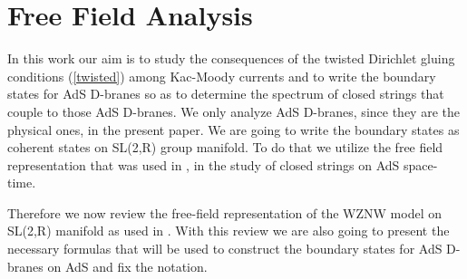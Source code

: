 \documentclass[a4paper,12pt]{article}
\begin{document}
\section{Free Field Analysis}

In this work our aim is to study the consequences of the twisted Dirichlet
gluing conditions (\ref{twisted}) among Kac-Moody currents and to write the
boundary states for AdS\coordHE{} D-branes so as to determine the spectrum of
closed strings that couple to those AdS\coordHE{} D-branes. We only analyze AdS\coordHE{} D-branes, since they are the physical ones, in the present paper. We
are going to write the boundary states as coherent states on SL(2,R) group
manifold. To do that we utilize the free field representation that was used
in \cite{bars1},\cite{BDM} in the study of closed strings on AdS\coordHE{}
space-time.

Therefore we now review the free-field representation of the WZNW model on
SL(2,R) manifold as used in \cite{BDM}. With this review we are also going
to present the necessary formulas that will be used to construct the
boundary states for AdS\coordHE{} D-branes on AdS\coordHE{} and fix the notation.
\end{document}
